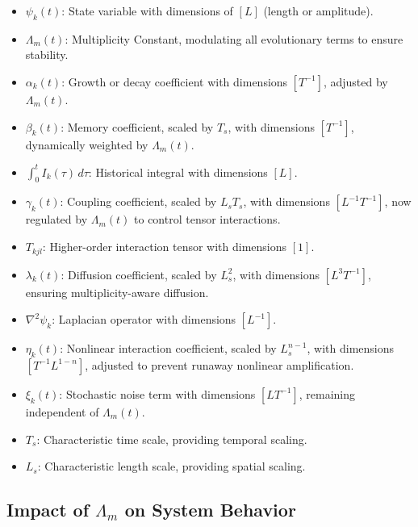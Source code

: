 \documentclass{article}
\theoremstyle{plain}
\begin{document}
\begin{itemize}
    \item \( \psi_k(t) \): State variable with dimensions of \( [L] \) (length or amplitude).
    \item \( \Lambda_m(t) \): Multiplicity Constant, modulating all evolutionary terms to ensure stability.
    \item \( \alpha_k(t) \): Growth or decay coefficient with dimensions \( [T^{-1}] \), adjusted by \( \Lambda_m(t) \).
    \item \( \beta_k(t) \): Memory coefficient, scaled by \( T_s \), with dimensions \( [T^{-1}] \), dynamically weighted by \( \Lambda_m(t) \).
    \item \( \int_0^t I_k(\tau) \, d\tau \): Historical integral with dimensions \( [L] \).
    \item \( \gamma_k(t) \): Coupling coefficient, scaled by \( L_s T_s \), with dimensions \( [L^{-1} T^{-1}] \), now regulated by \( \Lambda_m(t) \) to control tensor interactions.
    \item \( T_{kjl} \): Higher-order interaction tensor with dimensions \( [1] \).
    \item \( \lambda_k(t) \): Diffusion coefficient, scaled by \( L_s^2 \), with dimensions \( [L^3 T^{-1}] \), ensuring multiplicity-aware diffusion.
    \item \( \nabla^2 \psi_k \): Laplacian operator with dimensions \( [L^{-1}] \).
    \item \( \eta_k(t) \): Nonlinear interaction coefficient, scaled by \( L_s^{n-1} \), with dimensions \( [T^{-1} L^{1-n}] \), adjusted to prevent runaway nonlinear amplification.
    \item \( \xi_k(t) \): Stochastic noise term with dimensions \( [L T^{-1}] \), remaining independent of \( \Lambda_m(t) \).
    \item \( T_s \): Characteristic time scale, providing temporal scaling.
    \item \( L_s \): Characteristic length scale, providing spatial scaling.
\end{itemize}

\subsection{Impact of \( \Lambda_m \) on System Behavior}
\end{document}
